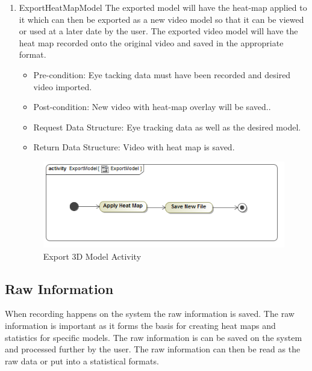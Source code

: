\begin{enumerate}
			
			
			\item{ExportHeatMapModel}
			The exported model will have the heat-map applied to it which can then be exported as a new video model so that it can be viewed or used at a later date by the user. The exported video model will have the heat map recorded onto the original video and saved in the appropriate format.
			\begin{itemize}
				\item Pre-condition: Eye tacking data must have been recorded and desired video imported.
				\item Post-condition: New video with heat-map overlay will be saved..
				\item Request Data Structure: Eye tracking data as well as the desired model.
				\item Return Data Structure: Video with heat map is saved.
			\end{itemize}
		\begin{figure}[!ht]
			\centering
			\includegraphics[scale=0.5]{Diagrams/Activity_Diagram__ExportModel__ExportModel.png}
			\caption{Export 3D Model Activity}
		\end{figure}
	
		\end{enumerate}
		
\subsection{Raw Information}
When recording happens on the system the raw information is saved. The raw information is important as it forms the basis for creating heat maps and statistics for specific models. The raw information is can be saved on the system and processed further by the user. The raw information can then be read as the raw data or put into a statistical formats.
\newline

